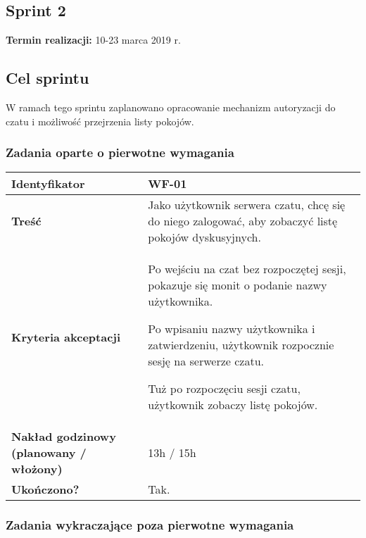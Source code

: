 \subsection{Sprint 2}

\textbf{Termin realizacji:} 10-23 marca 2019 r.

\subsection{Cel sprintu}
W ramach tego sprintu zaplanowano opracowanie mechanizm autoryzacji do czatu i
możliwość przejrzenia listy pokojów.

\subsubsection{Zadania oparte o pierwotne wymagania}

\begin{tabular}{ | l | l | }
	\hline
		\textbf{Identyfikator} &
		WF-01
		\\

	\hline
		\textbf{Treść} & \parbox[t]{11.5cm}{\strut
			Jako użytkownik serwera czatu, chcę się do niego zalogować, aby zobaczyć listę pokojów dyskusyjnych.
		\strut}\\

	\hline
		\parbox[t]{4cm}{\textbf{Kryteria akceptacji}} & \parbox[t]{11.5cm}{\strut
			\begin{enumreq}
				\item Po wejściu na czat bez rozpoczętej sesji, pokazuje się monit o podanie nazwy użytkownika.
				\item Po wpisaniu nazwy użytkownika i zatwierdzeniu, użytkownik rozpocznie sesję na serwerze czatu.
				\item Tuż po rozpoczęciu sesji czatu, użytkownik zobaczy listę pokojów.
			\end{enumreq}
			\strut}
		\\

    \hline
      \parbox[t]{4cm}{\textbf{Nakład godzinowy (planowany / włożony)}} & \parbox[t]{11.5cm}{\strut
        13h / 15h
      \strut}\\
	\hline

    \hline
      \parbox[t]{4cm}{\textbf{Ukończono?}} &
      \parbox[t]{11.5cm}{\strut
        Tak.
      \strut}\\

      \hline
  \end{tabular}


\subsubsection{Zadania wykraczające poza pierwotne wymagania}

